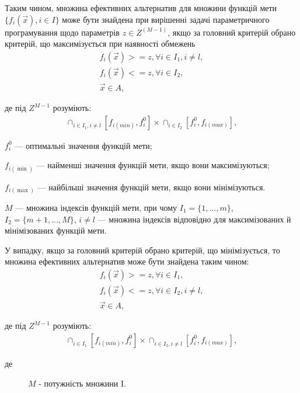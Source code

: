 Таким чином, множина ефективних альтернатив для множини функцій мети $\{f_i(\vec{x}), i \in I\}$ може бути знайдена при вирішенні задачі параметричного програмування щодо параметрів $z \in Z^{(M-1)}$, якщо за головний критерій обрано критерій, що максимізується при наявності обмежень
\begin{gather*} 
    f_i (\vec{x}) >= z, \forall i \in I_1, i \not = l,\\
    f_i (\vec{x}) <= z, \forall i \in I_2,  \\
    \vec{x} \in A,
\end{gather*}

де під $Z^{M-1}$ розуміють:
\begin{gather*}
    \cap_{i \in I_1, i \not = l} ^ {} [f_{i(min)}, f_i^0] \times \cap_{i \in I_2} ^ {} [f_i^0, f_{i(max)}],
\end{gather*}
\begin{description}
    \item[де] $f_i^0$ --- оптимальні значення функцій мети;
    \item $f_{i(\min)}$ --- найменші значення функцій мети, якщо вони максимізуються;
    \item $f_{i(\max)}$ --- найбільші значення функцій мети, якщо вони мінімізуються.
    \item $M$ --- множина індексів функцій мети, при чому $I_1=\{1, \ldots, m\}$, $I_2 = \{m + 1, \ldots, M\}$, $i \not = l$ --- множина індексів відповідно для максимізованих й мінімізованих функцій мети.
\end{description}

У випадку, якщо за головний критерій обрано критерій, що мінімізується, то множина ефективних альтернатив може бути знайдена таким чином: 
\begin{gather*} 
    f_i (\vec{x}) >= z, \forall i \in I_1, \\
    f_i (\vec{x}) <= z, \forall i \in I_2, i \not = l, \\
    \vec{x} \in A,
\end{gather*}

де під $Z^{M-1}$ розуміють:
\begin{gather*}
    \cap_{i \in I_1} ^ {} [f_{i(min)}, f_i^0] \times \cap_{i \in I_2, i \not = l} ^ {} [f_i^0, f_{i(max)}],
\end{gather*}
\begin{description}
    \item[де] $M$ - потужність множини I.
\end{description}

